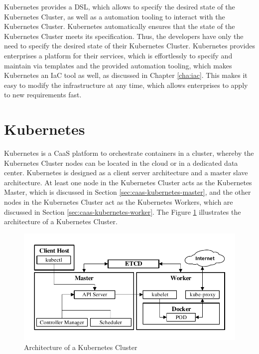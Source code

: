 Kubernetes provides a DSL, which allows to specify the desired state of the Kubernetes Cluster, as well as a automation tooling to interact with the Kubernetes Cluster. Kubernetes automatically ensures that the state of the Kubernetes Cluster meets its specification. Thus, the developers have only the need to specify the desired state of their Kubernetes Cluster. Kubernetes provides enterprises a platform for their services, which is effortlessly to specify and maintain via templates and the provided automation tooling, which makes Kubernetes an IaC tool as well, as discussed in Chapter \vref{cha:iac}. This makes it easy to modify the infrastructure at any time, which allows enterprises to apply to new requirements fast.

\section{Kubernetes}
\label{sec:caas-kubernetes}
Kubernetes is a CaaS platform to orchestrate containers in a cluster, whereby the Kubernetes Cluster nodes can be located in the cloud or in a dedicated data center. Kubernetes is designed as a client server architecture and a master slave architecture. At least one node in the Kubernetes Cluster acts as the Kubernetes Master, which is discussed in Section \vref{sec:caas-kubernetes-master}, and the other nodes in the Kubernetes Cluster act as the Kubernetes Workers, which are discussed in Section \vref{sec:caas-kubernetes-worker}. The Figure \ref{fig:kubernetes-cluster-architecture} illustrates the architecture of a Kubernetes Cluster.

\begin{figure}[htbp]
	\centering
	\includegraphics[scale=1]{images/kubernetes-cluster-architecture.pdf}
	\caption{Architecture of a Kubernetes Cluster}
	\label{fig:kubernetes-cluster-architecture}
\end{figure} 

